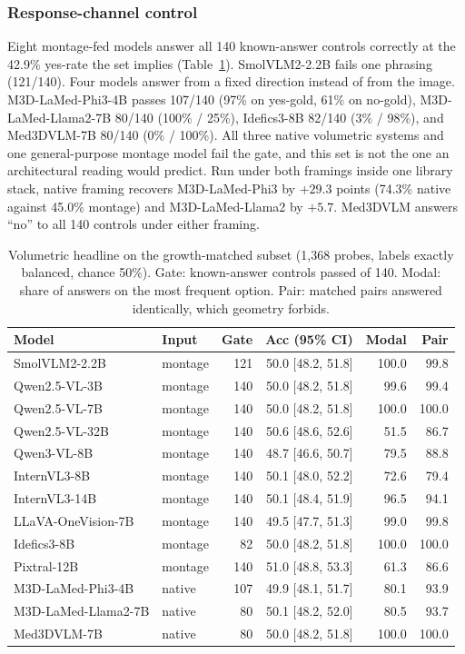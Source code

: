 \subsubsection{Response-channel control} Eight montage-fed models answer all
140 known-answer controls correctly at the 42.9\% yes-rate the set implies
(Table~\ref{tab:headline3d}). SmolVLM2-2.2B fails one phrasing (121/140).
Four models answer from a fixed direction instead of from the image.
M3D-LaMed-Phi3-4B passes 107/140 (97\% on yes-gold, 61\% on no-gold),
M3D-LaMed-Llama2-7B 80/140 (100\% / 25\%), Idefics3-8B 82/140 (3\% / 98\%),
and Med3DVLM-7B 80/140 (0\% / 100\%). All three native volumetric systems
and one general-purpose montage model fail the gate, and this set is not the
one an architectural reading would predict. Run under both framings inside
one library stack, native framing recovers M3D-LaMed-Phi3 by $+29.3$ points
(74.3\% native against 45.0\% montage) and M3D-LaMed-Llama2 by $+5.7$.
Med3DVLM answers ``no'' to all 140 controls under either framing.

\begin{table}[!t]
\caption{Volumetric headline on the growth-matched subset (1{,}368 probes,
labels exactly balanced, chance 50\%). Gate: known-answer controls passed of
140. Modal: share of answers on the most frequent option. Pair:
matched pairs answered identically, which geometry forbids.}
\label{tab:headline3d}
\centering
\fontsize{7.5}{9}\selectfont
\setlength\tabcolsep{3pt}
\begin{tabular}{llrrrr}
\toprule
Model & Input & Gate & Acc (95\% CI) & Modal & Pair \\
\midrule
SmolVLM2-2.2B & montage & 121 & 50.0 [48.2, 51.8] & 100.0 & 99.8 \\
Qwen2.5-VL-3B & montage & 140 & 50.0 [48.2, 51.8] & 99.6 & 99.4 \\
Qwen2.5-VL-7B & montage & 140 & 50.0 [48.2, 51.8] & 100.0 & 100.0 \\
Qwen2.5-VL-32B & montage & 140 & 50.6 [48.6, 52.6] & 51.5 & 86.7 \\
Qwen3-VL-8B & montage & 140 & 48.7 [46.6, 50.7] & 79.5 & 88.8 \\
InternVL3-8B & montage & 140 & 50.1 [48.0, 52.2] & 72.6 & 79.4 \\
InternVL3-14B & montage & 140 & 50.1 [48.4, 51.9] & 96.5 & 94.1 \\
LLaVA-OneVision-7B & montage & 140 & 49.5 [47.7, 51.3] & 99.0 & 99.8 \\
Idefics3-8B & montage & 82 & 50.0 [48.2, 51.8] & 100.0 & 100.0 \\
Pixtral-12B & montage & 140 & 51.0 [48.8, 53.3] & 61.3 & 86.6 \\
M3D-LaMed-Phi3-4B & native & 107 & 49.9 [48.1, 51.7] & 80.1 & 93.9 \\
M3D-LaMed-Llama2-7B & native & 80 & 50.1 [48.2, 52.0] & 80.5 & 93.7 \\
Med3DVLM-7B & native & 80 & 50.0 [48.2, 51.8] & 100.0 & 100.0 \\
\bottomrule
\end{tabular}
\end{table}

